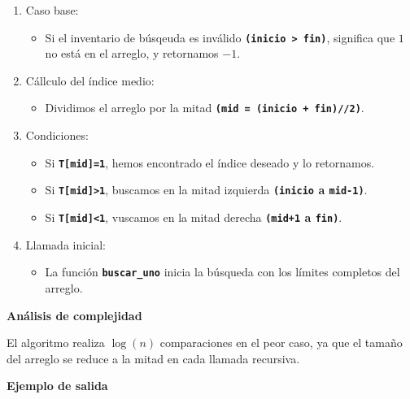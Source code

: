 \begin{enumerate}[label=\color{red}\textbf{\arabic*)}]
\begin{enumerate}[label=\arabic*)]
      \begin{enumerate}[label=\arabic*)]
        \item Caso base:
          \begin{itemize}[label=\textbullet]
            \item Si el inventario de búsqeuda es inválido \textbf{\texttt{(inicio > fin)}}, significa que $1$ no está en el arreglo, y retornamos $-1$.
          \end{itemize}
        \item Cállculo del índice medio:
          \begin{itemize}[label=\textbullet]
            \item Dividimos el arreglo por la mitad \textbf{\texttt{(mid = (inicio + fin)//2)}}.
          \end{itemize}
        \item Condiciones:
          \begin{itemize}[label=\textbullet]
            \item Si \textbf{\texttt{T[mid]=1}}, hemos encontrado el índice deseado y lo retornamos.
            \item Si \textbf{\texttt{T[mid]>1}}, buscamos en la mitad izquierda \textbf{\texttt{(inicio} a \texttt{mid-1)}}.
            \item Si \textbf{\texttt{T[mid]<1}}, vuscamos en la mitad derecha \textbf{\texttt{(mid+1} a \texttt{fin)}}.  
          \end{itemize}
        \item Llamada inicial:
          \begin{itemize}[label=\textbullet]
            \item La función \textbf{\texttt{buscar\_uno}} inicia la búsqueda con los límites completos del arreglo. 
          \end{itemize}
      \end{enumerate}
      \textbf{Análisis de complejidad}

      El algoritmo realiza $\log(n)$ comparaciones en el peor caso, ya que el tamaño del arreglo se reduce a la mitad en cada llamada recursiva.

      \textbf{Ejemplo de salida}


\end{enumerate}
\end{enumerate}
